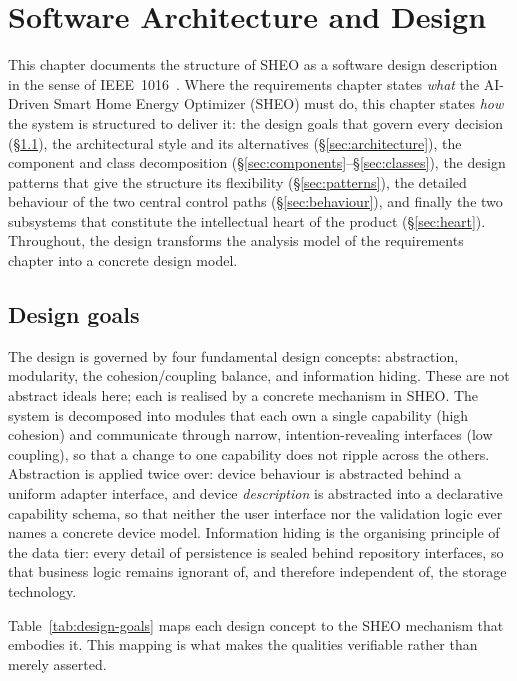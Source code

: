 \chapter{Software Architecture and Design}\label{chap:design}

This chapter documents the structure of SHEO as a software design description in the
sense of IEEE~1016~\cite{ieee1016}. Where the
requirements chapter states \emph{what} the AI-Driven Smart Home Energy Optimizer
(SHEO) must do, this chapter states \emph{how} the system is structured to deliver
it: the design goals that govern every decision (\S\ref{sec:design-goals}), the
architectural style and its alternatives (\S\ref{sec:architecture}), the component
and class decomposition (\S\ref{sec:components}--\S\ref{sec:classes}), the
design patterns that give the structure its flexibility
(\S\ref{sec:patterns}), the detailed behaviour of the two central control paths
(\S\ref{sec:behaviour}), and finally the two subsystems that constitute the
intellectual heart of the product (\S\ref{sec:heart}). Throughout, the design
transforms the analysis model of the requirements chapter into a concrete design model.

\section{Design goals}
\label{sec:design-goals}

The design is governed by four fundamental design concepts: abstraction,
modularity, the cohesion/coupling balance, and information hiding. These are not
abstract ideals here; each is realised by a concrete mechanism in SHEO. The system
is decomposed into modules that each own a single capability (high cohesion) and
communicate through narrow, intention-revealing interfaces (low coupling), so that
a change to one capability does not ripple across the others. Abstraction is applied
twice over: device behaviour is abstracted behind a uniform adapter interface, and
device \emph{description} is abstracted into a declarative capability schema, so that
neither the user interface nor the validation logic ever names a concrete device
model. Information hiding is the organising principle of the data tier: every detail
of persistence is sealed behind repository interfaces, so that business logic remains
ignorant of, and therefore independent of, the storage technology.

Table~\ref{tab:design-goals} maps each design concept to the SHEO mechanism that
embodies it. This mapping is what makes the qualities verifiable rather than merely
asserted.

